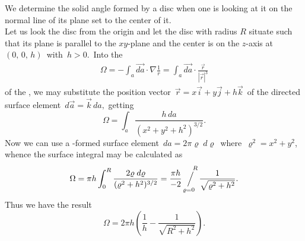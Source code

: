 \documentclass[12pt]{article}
\newcommand{\sijoitus}[2]%
{\operatornamewithlimits{\Big/}_{\!\!\!#1}^{\,#2}}
\begin{document}
We determine the solid angle formed by a disc when one is looking at it on the normal line of its plane set to the center of it.\\

Let us look the disc from the origin and let the disc with radius $R$ situate such that its plane is parallel to the $xy$-plane and the center is on the $z$-axis at\, $(0,\,0,\,h)$\, with\, $h > 0$.\, Into the 
\begin{align}         
\Omega = -\int_a \vec{da}\cdot\nabla\frac{1}{r} = \int_a \vec{da}\cdot\frac{\vec{r}}{|\vec{r}|^3}
\end{align}
of the , we may substitute the position vector \,$\vec{r} = x\vec{i}+y\vec{j}+h\vec{k}$\, of the directed surface element \,$d\vec{a} = \vec{k}\,da,$
getting         
$$\Omega = \int_a \frac{h\,da}{(x^2+y^2+h^2)^{3/2}}.$$
Now we can use a -formed surface element \,$da = 2\pi\varrho\;d\varrho$\, where\, $\varrho^2 = x^2+y^2$, whence the surface integral may be calculated as
$$\Omega = \pi h\int_0^R \frac{2\varrho\;d\varrho}{(\varrho^2+h^2)^{3/2}} = 
\frac{\pi h}{-2}\sijoitus{\varrho=0}{\quad R}\frac{1}{\sqrt{\varrho^2+h^2}}.\\$$
Thus we have the result
$$\Omega = 2\pi h\left(\frac{1}{h}-\frac{1}{\sqrt{R^2+h^2}}\right)\!.$$

\end{document}
